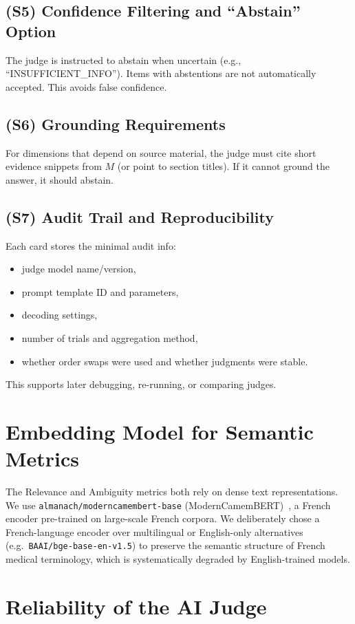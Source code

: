 \documentclass[11pt]{article}
\begin{document}
\subsection{(S5) Confidence Filtering and ``Abstain'' Option}
The judge is instructed to abstain when uncertain (e.g., ``INSUFFICIENT\_INFO''). Items with abstentions are not automatically accepted. This avoids false confidence.

\subsection{(S6) Grounding Requirements}
For dimensions that depend on source material, the judge must cite short evidence snippets from $M$ (or point to section titles). If it cannot ground the answer, it should abstain.

\subsection{(S7) Audit Trail and Reproducibility}
Each card stores the minimal audit info:
\begin{itemize}[leftmargin=*]
  \item judge model name/version,
  \item prompt template ID and parameters,
  \item decoding settings,
  \item number of trials and aggregation method,
  \item whether order swaps were used and whether judgments were stable.
\end{itemize}
This supports later debugging, re-running, or comparing judges.

\section{Embedding Model for Semantic Metrics}
The Relevance and Ambiguity metrics both rely on dense text representations. We use \texttt{almanach/moderncamembert-base} (ModernCamemBERT)~\cite{labrak2023moderncamembert}, a French encoder pre-trained on large-scale French corpora. We deliberately chose a French-language encoder over multilingual or English-only alternatives (e.g.\ \texttt{BAAI/bge-base-en-v1.5}) to preserve the semantic structure of French medical terminology, which is systematically degraded by English-trained models.

\section{Reliability of the AI Judge}
\end{document}

